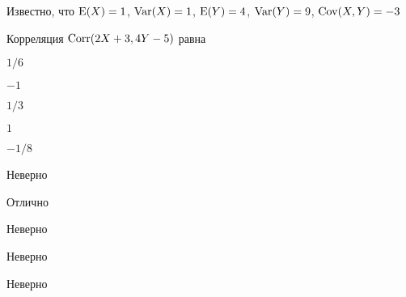 
\begin{question}
Известно, что \(\operatorname{E}(X)=1\), \(\operatorname{Var}(X)=1\), \(\operatorname{E}(Y)=4\), \(\operatorname{Var}(Y)=9\),
\(\operatorname{Cov}(X,Y)=-3\)

\vspace{0.5cm}

Корреляция \(\operatorname{Corr}(2X+3,4Y-5)\) равна
\begin{answerlist}
  \item \(1/6\)
  \item \(-1\)
  \item \(1/3\)
  \item \(1\)
  \item \(-1/8\)
\end{answerlist}
\end{question}

\begin{solution}
\begin{answerlist}
  \item Неверно
  \item Отлично
  \item Неверно
  \item Неверно
  \item Неверно
\end{answerlist}
\end{solution}

